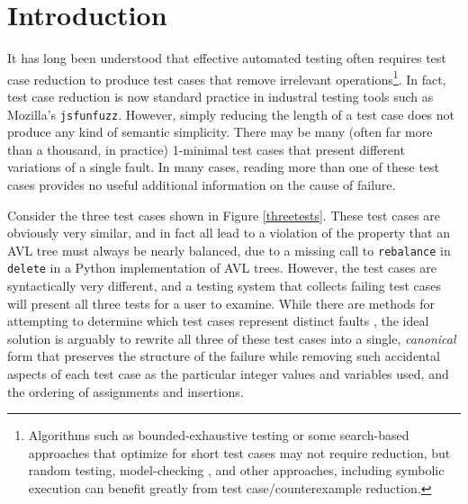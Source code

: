 \section{Introduction}

It has long been understood that effective automated testing often requires
test case reduction \cite{DD,MinUnit,TCminim,ICSEDiff} to produce test cases
that remove irrelevant operations\footnote{Algorithms such as
  bounded-exhaustive testing \cite{SoftBET} or some search-based approaches that
  optimize for short test cases \cite{FA11} may not require reduction, but random
  testing, model-checking \cite{Gastin04minimizationof}, and other
  approaches, including symbolic execution \cite{issta14} can benefit greatly from
  test case/counterexample reduction.}.  In fact, test case reduction is
now standard practice in industral testing tools such as Mozilla's
{\tt jsfunfuzz}.  However, simply reducing the length of a test case
does not produce any kind of semantic simplicity.  There may be many
(often far more than a thousand, in practice) 1-minimal test cases
that present different variations of a single fault.  In many cases,
reading more than one of these test cases provides no useful
additional information on the cause of failure.

Consider the three test cases shown in Figure \ref{threetests}.  These
test cases are obviously very similar, and in fact all lead to a
violation of the property that an AVL tree must always be nearly
balanced, due to a missing call to {\tt rebalance} in {\tt delete} in
a Python implementation of AVL trees.  However, the test cases are
syntactically very different, and a testing system that collects
failing test cases will present all three tests for a user to examine.
While there are methods for attempting to determine which test cases
represent distinct faults \cite{PLDI13}, the ideal solution is
arguably to rewrite all three of these test cases into a single,
\emph{canonical} form that preserves the structure of the failure while removing
such accidental aspects of each test case as the particular integer
values and variables used, and the ordering of assignments and
insertions.

